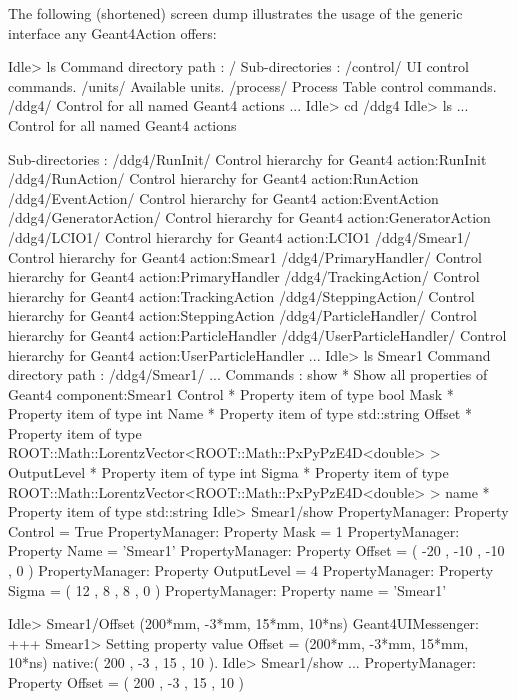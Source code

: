 \noindent
The following (shortened) screen dump illustrates the usage of the 
generic interface any Geant4Action offers:
\begin{unnumberedcode}
Idle> ls
Command directory path : /
 Sub-directories : 
   /control/   UI control commands.
   /units/   Available units.
   /process/   Process Table control commands.
   /ddg4/   Control for all named Geant4 actions
   ...
Idle> cd /ddg4
Idle> ls
...
Control for all named Geant4 actions

 Sub-directories : 
   /ddg4/RunInit/   Control hierarchy for Geant4 action:RunInit
   /ddg4/RunAction/   Control hierarchy for Geant4 action:RunAction
   /ddg4/EventAction/   Control hierarchy for Geant4 action:EventAction
   /ddg4/GeneratorAction/   Control hierarchy for Geant4 action:GeneratorAction
   /ddg4/LCIO1/   Control hierarchy for Geant4 action:LCIO1
   /ddg4/Smear1/   Control hierarchy for Geant4 action:Smear1
   /ddg4/PrimaryHandler/   Control hierarchy for Geant4 action:PrimaryHandler
   /ddg4/TrackingAction/   Control hierarchy for Geant4 action:TrackingAction
   /ddg4/SteppingAction/   Control hierarchy for Geant4 action:SteppingAction
   /ddg4/ParticleHandler/   Control hierarchy for Geant4 action:ParticleHandler
   /ddg4/UserParticleHandler/   Control hierarchy for Geant4 action:UserParticleHandler
   ...
Idle> ls Smear1
Command directory path : /ddg4/Smear1/
 ...
 Commands : 
   show * Show all properties of Geant4 component:Smear1
   Control * Property item of type bool
   Mask * Property item of type int
   Name * Property item of type std::string
   Offset * Property item of type ROOT::Math::LorentzVector<ROOT::Math::PxPyPzE4D<double> >
   OutputLevel * Property item of type int
   Sigma * Property item of type ROOT::Math::LorentzVector<ROOT::Math::PxPyPzE4D<double> >
   name * Property item of type std::string
Idle> Smear1/show
PropertyManager: Property Control = True
PropertyManager: Property Mask = 1
PropertyManager: Property Name = 'Smear1'
PropertyManager: Property Offset = ( -20 , -10 , -10 , 0 )
PropertyManager: Property OutputLevel = 4
PropertyManager: Property Sigma = ( 12 , 8 , 8 , 0 )
PropertyManager: Property name = 'Smear1'

Idle> Smear1/Offset (200*mm, -3*mm, 15*mm, 10*ns)
Geant4UIMessenger: +++ Smear1> Setting property value Offset = (200*mm, -3*mm, 15*mm, 10*ns)  
                               native:( 200 , -3 , 15 , 10 ).
Idle> Smear1/show                                
...
PropertyManager: Property Offset = ( 200 , -3 , 15 , 10 )

\end{unnumberedcode}

\newpage

